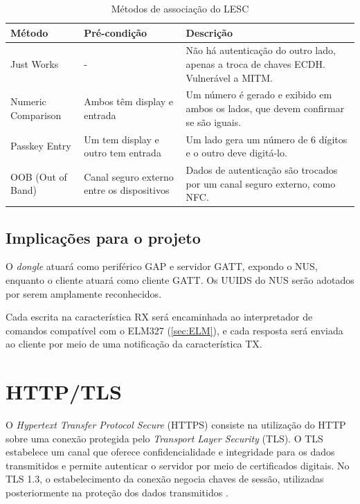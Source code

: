 \begin{table}[H] 	\label{lesc:metodos}
	\centering
	\caption{Métodos de associação do LESC}
	\begin{tabular}{|>{\centering\arraybackslash}m{}|>{\raggedright\arraybackslash}m{}|>{\raggedright\arraybackslash}m{}|}
		\hline
		\textbf{Método} & \textbf{Pré-condição} & \textbf{Descrição} \\
		\hline
		Just Works & - & Não há autenticação do outro lado, apenas a troca de chaves ECDH. Vulnerável a MITM. \\
		\hline
		Numeric Comparison & Ambos têm display e entrada & Um número é gerado e exibido em ambos os lados, que devem confirmar se são iguais. \\
		\hline
		Passkey Entry & Um tem display e outro tem entrada & Um lado gera um número de 6 dígitos e o outro deve digitá-lo. \\
		\hline
		OOB \newline (Out of Band) & Canal seguro externo entre os dispositivos & Dados de autenticação são trocados por um canal seguro externo, como NFC. \\
		\hline
	\end{tabular}
\end{table}


\subsection{Implicações para o projeto}

O \textit{dongle} atuará como periférico GAP e servidor GATT, expondo o NUS, enquanto o cliente atuará como cliente GATT. Os UUIDS do NUS serão adotados por serem amplamente reconhecidos. 

Cada escrita na característica RX será encaminhada ao interpretador de comandos compatível com o ELM327 (\autoref{sec:ELM}), e cada resposta será enviada ao cliente por meio de uma notificação da característica TX.


\section{HTTP/TLS} \label{sec:conceitos-tls}


O \textit{Hypertext Transfer Protocol Secure} (HTTPS) consiste na utilização do HTTP sobre uma conexão protegida pelo \textit{Transport Layer Security} (TLS). O TLS estabelece um canal que oferece confidencialidade e integridade para os dados transmitidos e permite autenticar o servidor por meio de certificados digitais. No TLS 1.3, o estabelecimento da conexão negocia chaves de sessão, utilizadas posteriormente na proteção dos dados transmitidos \cite{RFC9846}.


